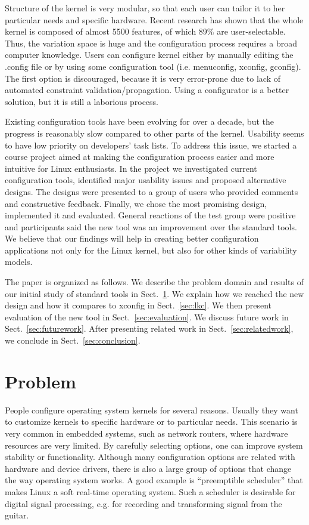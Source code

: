 \documentclass{chi2009}
\newcommand{\secref}[1]{Sect.~\ref{sec:#1}}
\begin{document}
Structure of the kernel is very modular, so that each user can tailor it to her particular needs and specific hardware. Recent research \cite{she:kernel:2010} has shown that the whole kernel is composed of almost 5500 features, of which 89\% are user-selectable. Thus, the variation space is huge and the configuration process requires a broad computer knowledge. Users can configure kernel either by manually editing the \textsf{.config} file or by using some configuration tool (i.e. \textsf{menuconfig, xconfig, gconfig}). The first option is discouraged, because it is very error-prone due to lack of automated constraint validation/propagation. Using a configurator is a better solution, but it is still a laborious process.

Existing configuration tools have been evolving for over a decade, but the progress is reasonably slow compared to other parts of the kernel. Usability seems to have low priority on developers' task lists. To address this issue, we started a course project aimed at making the configuration process easier and more intuitive for Linux enthusiasts. In the project we investigated current configuration tools, identified major usability issues and proposed alternative designs. The designs were presented to a group of users who provided comments and constructive feedback. Finally, we chose the most promising design, implemented it and evaluated. General reactions of the test group were positive and participants said the new tool was an improvement over the standard tools. We believe that our findings will help in creating better configuration applications not only for the Linux kernel, but also for other kinds of variability models.

The paper is organized as follows. We describe the problem domain and results of our initial study of standard tools in \secref{problem}. We explain how we reached the new design and how it compares to \textsf{xconfig} in \secref{lkc}. We then present evaluation of the new tool in \secref{evaluation}. We discuss future work in \secref{futurework}. After presenting related work in \secref{relatedwork}, we conclude in \secref{conclusion}.

\section{Problem}\label{sec:problem}

People configure operating system kernels for several reasons. Usually they want to customize kernels to specific hardware or to particular needs. This scenario is very common in embedded systems, such as network routers, where hardware resources are very limited. By carefully selecting options, one can improve system stability or functionality. Although many configuration options are related with hardware and device drivers, there is also a large group of options that change the way operating system works. A good example is ``preemptible scheduler'' that makes Linux a soft real-time operating system. Such a scheduler is desirable for digital signal processing, e.g. for recording and transforming signal from the guitar.
\end{document}
